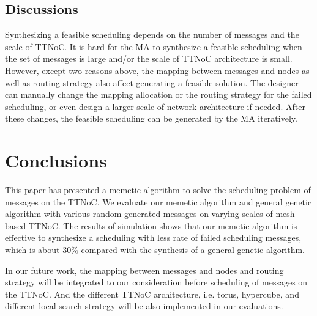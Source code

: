 \documentclass[10pt,journal]{IEEEtran}
\theoremstyle{remark}
\begin{document}
\subsection{Discussions}

Synthesizing a feasible scheduling depends on the number of messages and the scale of TTNoC.
It is hard for the MA to synthesize a feasible scheduling when the set of messages is large and/or the scale of TTNoC architecture is small.
However,
 except two reasons above,
  the mapping between messages and nodes as well as routing strategy also affect generating a feasible solution.
The designer can manually change the mapping allocation or the routing strategy for the failed scheduling,
 or even design a larger scale of network architecture if needed.
After these changes,
   the feasible scheduling can be generated by the MA iteratively. 

\section{Conclusions \label{s:conclud}}

This paper has presented a memetic algorithm to solve the scheduling problem of messages on the TTNoC.
We evaluate our memetic algorithm and general genetic algorithm with various random generated messages on varying scales of mesh-based TTNoC.
The results of simulation shows that our memetic algorithm is effective to synthesize a scheduling with less rate of failed scheduling messages, which is about 30\% compared with the synthesis of a general genetic algorithm.

In our future work,
the mapping between messages and nodes and routing strategy will be integrated to our consideration before scheduling of messages on the TTNoC.
And the different TTNoC architecture,
i.e. torus, hypercube,
and different local search strategy will be also implemented in our evaluations.







\ifCLASSOPTIONcaptionsoff
\newpage
\fi
\end{document}

